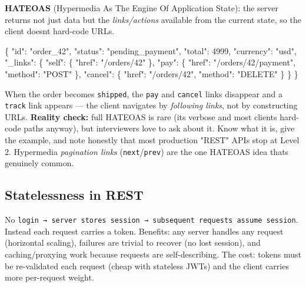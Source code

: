 \documentclass[11pt]{article}
\newenvironment{Shaded}{\begin{snugshade}}{\end{snugshade}}
\newcommand{\DataTypeTok}[1]{\textcolor[rgb]{0.16,0.50,0.73}{#1}}
\newcommand{\DecValTok}[1]{\textcolor[rgb]{0.96,0.45,0.00}{#1}}
\newcommand{\FunctionTok}[1]{\textcolor[rgb]{0.56,0.27,0.68}{#1}}
\newcommand{\StringTok}[1]{\textcolor[rgb]{0.96,0.31,0.31}{#1}}
\begin{document}
\textbf{HATEOAS} (Hypermedia As The Engine Of Application State): the server returns not just data but the \emph{links/actions} available from the current state, so the client doesn\textquotesingle t hard-code URLs.


\begin{Shaded}
\begin{Highlighting}[]
\FunctionTok{\{}
  \DataTypeTok{"id"}\FunctionTok{:} \StringTok{"order\_42"}\FunctionTok{,}
  \DataTypeTok{"status"}\FunctionTok{:} \StringTok{"pending\_payment"}\FunctionTok{,}
  \DataTypeTok{"total"}\FunctionTok{:} \DecValTok{4999}\FunctionTok{,}
  \DataTypeTok{"currency"}\FunctionTok{:} \StringTok{"usd"}\FunctionTok{,}
  \DataTypeTok{"\_links"}\FunctionTok{:} \FunctionTok{\{}
    \DataTypeTok{"self"}\FunctionTok{:}   \FunctionTok{\{} \DataTypeTok{"href"}\FunctionTok{:} \StringTok{"/orders/42"} \FunctionTok{\},}
    \DataTypeTok{"pay"}\FunctionTok{:}    \FunctionTok{\{} \DataTypeTok{"href"}\FunctionTok{:} \StringTok{"/orders/42/payment"}\FunctionTok{,} \DataTypeTok{"method"}\FunctionTok{:} \StringTok{"POST"} \FunctionTok{\},}
    \DataTypeTok{"cancel"}\FunctionTok{:} \FunctionTok{\{} \DataTypeTok{"href"}\FunctionTok{:} \StringTok{"/orders/42"}\FunctionTok{,} \DataTypeTok{"method"}\FunctionTok{:} \StringTok{"DELETE"} \FunctionTok{\}}
  \FunctionTok{\}}
\FunctionTok{\}}
\end{Highlighting}
\end{Shaded}

When the order becomes \texttt{shipped}, the \texttt{pay} and \texttt{cancel} links disappear and a \texttt{track} link appears --- the client navigates by \emph{following links}, not by constructing URLs. \textbf{Reality check:} full HATEOAS is rare (it\textquotesingle s verbose and most clients hard-code paths anyway), but interviewers love to ask about it. Know what it is, give the example, and note honestly that most production "REST" APIs stop at Level 2. Hypermedia \emph{pagination links} (\texttt{next}/\texttt{prev}) are the one HATEOAS idea that\textquotesingle s genuinely common.

\subsection{Statelessness in REST}\label{statelessness-in-rest}

No \texttt{login\ →\ server\ stores\ session\ →\ subsequent\ requests\ assume\ session}. Instead each request carries a token. Benefits: any server handles any request (horizontal scaling), failures are trivial to recover (no lost session), and caching/proxying work because requests are self-describing. The cost: tokens must be re-validated each request (cheap with stateless JWTs) and the client carries more per-request weight.
\end{document}
